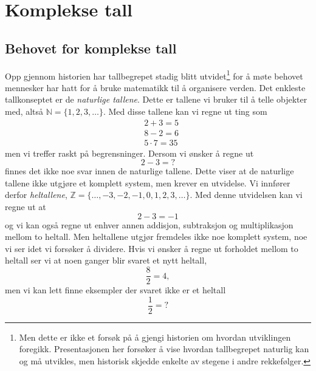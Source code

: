 \documentclass[a4paper,norsk,12pt]{article}
\begin{document}
\section{Komplekse tall}

\subsection{Behovet for komplekse tall}
Opp gjennom historien har tallbegrepet stadig blitt utvidet\footnote{Men dette er ikke et forsøk på å gjengi historien om hvordan utviklingen foregikk. Presentasjonen her forsøker å vise hvordan tallbegrepet naturlig kan og må utvikles, men historisk skjedde enkelte av stegene i andre rekkefølger.} for å møte behovet mennesker har hatt for å bruke matematikk til å organisere verden. Det enkleste tallkonseptet er de \emph{naturlige tallene}. Dette er tallene vi bruker til å telle objekter med, altså $\mathbb{N} = \{1, 2, 3, \ldots\}$. Med disse tallene kan vi regne ut ting som 
\begin{align*}
	&2 + 3 = 5 \\
	&8 - 2 = 6 \\
	&5\cdot 7 = 35
\end{align*}
men vi treffer raskt på begrensninger. Dersom vi ønsker å regne ut 
\begin{displaymath}
	2-3 = ?
\end{displaymath}
finnes det ikke noe svar innen de naturlige tallene. Dette viser at de naturlige tallene ikke utgjøre et komplett system, men krever en utvidelse. Vi innfører derfor \emph{heltallene}, $\mathbb{Z} = \{\ldots, -3, -2, -1, 0, 1, 2, 3, \ldots\}$. Med denne utvidelsen kan vi regne ut at
\begin{displaymath}
	2-3 = -1
\end{displaymath}
og vi kan også regne ut enhver annen addisjon, subtraksjon og multiplikasjon mellom to heltall. Men heltallene utgjør fremdeles ikke noe komplett system, noe vi ser idet vi forsøker å dividere. Hvis vi ønsker å regne ut forholdet mellom to heltall ser vi at noen ganger blir svaret et nytt heltall,
\begin{displaymath}
	\frac{8}{2} = 4,
\end{displaymath}
men vi kan lett finne eksempler der svaret ikke er et heltall
\begin{displaymath}
	\frac{1}{2} = ?
\end{displaymath}
\end{document}
